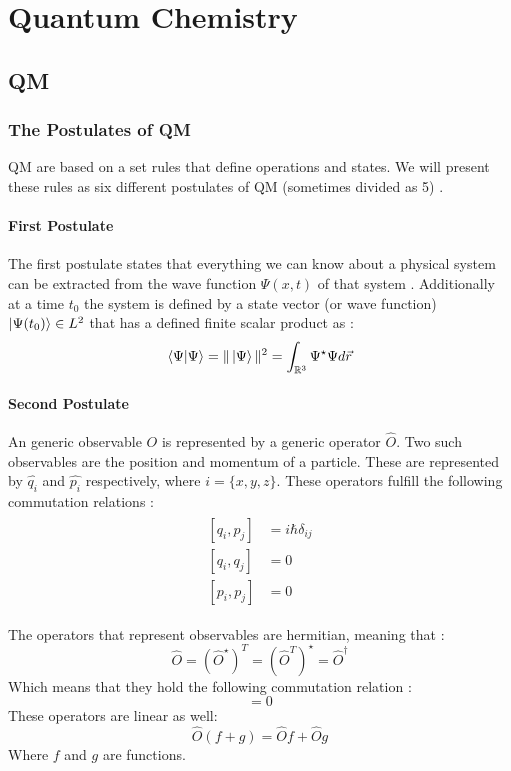 \documentclass[../master_thesis.tex]{subfiles}
\begin{document}
\chapter{Quantum Chemistry}
\section{\ac{QM}}

\subsection{The Postulates of \ac{QM}}

\ac{QM} are based on a set rules that define operations and states. We will
present these rules as six different postulates of \ac{QM} (sometimes divided
as 5) \cite{Atkins:2011, Cohen:1973}.

\subsubsection{First Postulate}
The first postulate states that everything we can know about a physical system
can be extracted from the wave function $\Psi(x, t)$ of that system
\cite{Atkins:2011}. Additionally at a time $t_0$ the system is defined by
a state vector (or wave function) $\ket{\Psi(t_0)}\in L^2$ that has a defined
finite scalar product as \cite{Cohen:1973}:
\begin{equation}
  \braket{\Psi|\Psi} = \|\ket{\Psi}\|^2 =  \int_{\mathbb{R}^3}\Psi^\star\Psi d\vec{r}
\end{equation}

\subsubsection{Second Postulate}
An generic observable $O$ is represented by a generic operator $\hat{O}$. Two
such observables are the position and momentum of a particle. These are
represented by $\hat{q_i}$ and $\hat{p_i}$ respectively, where
$i = \{x, y, z\}$. These operators fulfill the following commutation relations
\cite{Atkins:2011, Cohen:1973}:
\begin{align}
  \begin{split}
    [q_i, p_j] &= i \hbar \delta_{ij}\\
    [q_i, q_j] &= 0 \\
    [p_i, p_j] &= 0
  \end{split}
\end{align}

The operators that represent observables are hermitian, meaning that
\cite{Cohen:1973}:
\begin{equation}
  \hat{O} = (\hat{O}^{\star})^T = (\hat{O}^T)^{\star} = \hat{O}^{\dagger}
\end{equation}
Which means that they hold the following commutation relation
\cite{Cohen:1973}:
\begin{equation}
  [\hat{O}, \hat{O}^{\dagger}] = 0
\end{equation}
These operators are linear as well:
\begin{equation}
    \hat{O}(f + g) = \hat{O}f + \hat{O}g\label{eq:oplinearity}
\end{equation}
Where $f$ and $g$ are functions.
\end{document}

